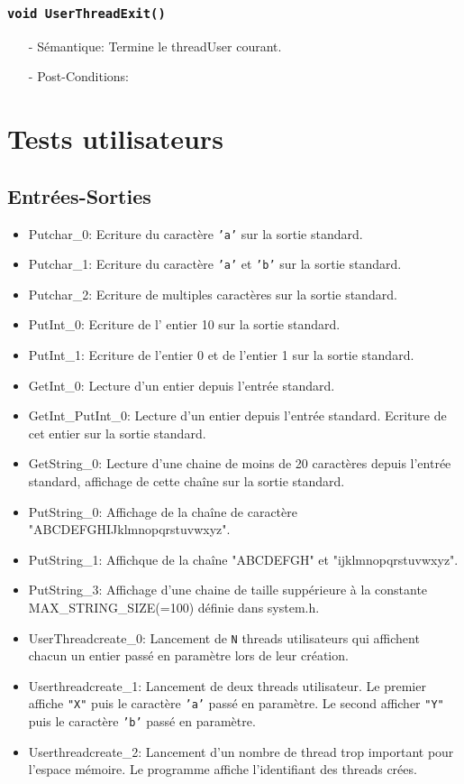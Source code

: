\documentclass[11pt]{article}
\begin{document}
\subsubsection{\texttt{void UserThreadExit()}}
\begin{itemize}
\item[-] Sémantique: Termine le threadUser courant.
\item[-] Post-Conditions: 
\end{itemize}



\section{Tests utilisateurs}



\subsection{Entrées-Sorties}
\begin{itemize}
\item Putchar_0: Ecriture du caractère \texttt{'a'} sur la sortie standard.
\item Putchar_1: Ecriture du caractère \texttt{'a'} et \texttt{'b'} sur la sortie standard.
\item Putchar_2: Ecriture de multiples caractères sur la sortie standard.
\item PutInt_0: Ecriture de l' entier 10 sur la sortie standard.
\item PutInt_1: Ecriture de l'entier 0 et de l'entier 1 sur la sortie standard.
\item GetInt_0: Lecture d'un entier depuis l'entrée standard.
\item GetInt_PutInt_0:
  Lecture d'un entier depuis l'entrée standard.
  Ecriture de cet entier sur la sortie standard.
\item GetString_0: Lecture d'une chaine de moins de 20 caractères depuis l'entrée standard, affichage
  de cette chaîne sur la sortie standard.
\item PutString_0: Affichage de la chaîne de caractère "ABCDEFGHIJklmnopqrstuvwxyz".
\item PutString_1: Affichque de la chaîne "ABCDEFGH" et "ijklmnopqrstuvwxyz".
\item PutString_3:   Affichage d'une chaine de taille suppérieure à la
  constante MAX_STRING_SIZE(=100) définie dans system.h.
\item UserThreadcreate_0: Lancement de \texttt{N} threads utilisateurs qui affichent chacun un entier passé en paramètre lors de leur
  création.
\item Userthreadcreate_1: Lancement de deux threads utilisateur. Le premier affiche \texttt{"X"} puis le caractère \texttt{'a'} passé en paramètre.
  Le second afficher \texttt{"Y"} puis le caractère \texttt{'b'} passé en paramètre.
\item Userthreadcreate_2: Lancement d'un nombre de thread trop important pour l'espace mémoire.
  Le programme affiche l'identifiant des threads crées.
\end{itemize}
\end{document}
